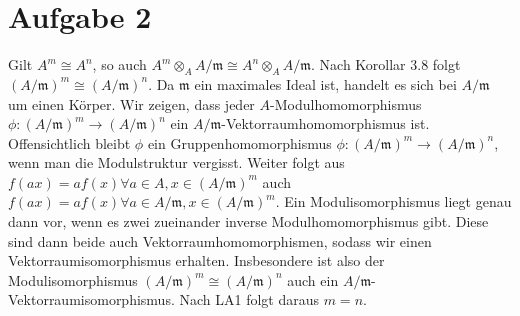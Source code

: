 \documentclass{article}
\begin{document}
\section*{Aufgabe 2}
Gilt $A^m \cong A^n$, so auch $A^m \otimes_A A/\mathfrak{m} \cong A^n \otimes_A A/\mathfrak{m}$.
Nach Korollar 3.8 folgt $(A/\mathfrak{m})^m \cong (A/\mathfrak{m})^n$.
Da $\mathfrak{m}$ ein maximales Ideal ist, handelt es sich bei $A/\mathfrak{m}$ um einen Körper.
Wir zeigen, dass jeder $A$-Modulhomomorphismus $\phi \colon (A/\mathfrak{m})^m \to (A/\mathfrak{m})^n$ ein $A/\mathfrak{m}$-Vektorraumhomomorphismus ist.
Offensichtlich bleibt $\phi$ ein Gruppenhomomorphismus $\phi\colon (A/\mathfrak{m})^m \to (A/\mathfrak{m})^n$, wenn man die Modulstruktur vergisst.
Weiter folgt aus $f(ax) = af(x) \forall a\in A, x\in (A/\mathfrak{m})^m$ auch $f(ax) = af(x) \forall a\in A/\mathfrak{m}, x \in (A/\mathfrak{m})^m$.
Ein Modulisomorphismus liegt genau dann vor, wenn es zwei zueinander inverse Modulhomomorphismus gibt.
Diese sind dann beide auch Vektorraumhomomorphismen, sodass wir einen Vektorraumisomorphismus erhalten.
Insbesondere ist also der Modulisomorphismus $(A/\mathfrak{m})^m \cong (A/\mathfrak{m})^n$ auch ein $A/\mathfrak{m}$-Vektorraumisomorphismus. Nach LA1 folgt daraus $m = n$.
\end{document}
